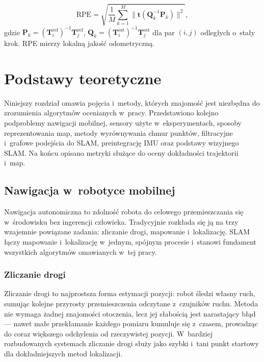 \begin{equation}
    \mathrm{RPE} = \sqrt{\frac{1}{M}\sum_{k=1}^{M}
    \| \mathbf{t}(\mathbf{Q}_k^{-1}\mathbf{P}_k) \|^2},
\end{equation}
gdzie $\mathbf{P}_k = (\mathbf{T}_i^{\mathrm{ref}})^{-1}\mathbf{T}_j^{\mathrm{ref}}$,
$\mathbf{Q}_k = (\mathbf{T}_i^{\mathrm{est}})^{-1}\mathbf{T}_j^{\mathrm{est}}$
dla par $(i,j)$ odległych o~stały krok.
RPE mierzy lokalną jakość odometryczną.



\chapter{Podstawy teoretyczne}

Niniejszy rozdział omawia pojęcia i~metody, których znajomość jest niezbędna
do zrozumienia algorytmów ocenianych w~pracy.
Przedstawiono kolejno podproblemy nawigacji mobilnej, sensory użyte
w~eksperymentach, sposoby reprezentowania map, metody wyrównywania chmur punktów,
filtracyjne i~grafowe podejścia do SLAM, preintegrację IMU oraz podstawy
wizyjnego SLAM.
Na końcu opisano metryki służące do oceny dokładności trajektorii i~map.

\section{Nawigacja w~robotyce mobilnej}

Nawigacja autonomiczna to zdolność robota do celowego przemieszczania się
w~środowisku bez ingerencji człowieka.
Tradycyjnie rozkłada się ją na trzy wzajemnie powiązane zadania:
zliczanie drogi, mapowanie i~lokalizację.
SLAM łączy mapowanie i~lokalizację w~jednym, spójnym procesie i~stanowi
fundament wszystkich algorytmów omawianych w~tej pracy.

\subsection{Zliczanie drogi}

Zliczanie drogi to najprostsza forma estymacji pozycji: robot śledzi
własny ruch, sumując kolejne przyrosty przemieszczenia odczytane z~czujników
ruchu.
Metoda nie wymaga żadnej znajomości otoczenia, lecz jej słabością jest
narastający błąd --- nawet małe przekłamanie każdego pomiaru kumuluje się
z~czasem, prowadząc do coraz większego odchylenia od rzeczywistej pozycji.
W~bardziej rozbudowanych systemach zliczanie drogi służy jako szybki
i~tani punkt startowy dla dokładniejszych metod lokalizacji.

